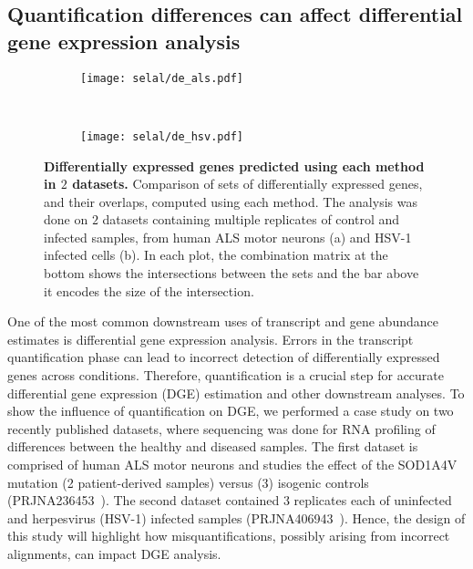 \subsection{Quantification differences can affect differential gene expression analysis}
\label{sec:DE}
\begin{figure}[ht!]
    \centering
    \begin{subfigure}[t]{0.49\textwidth}
        \centering
  	  	\texttt{[image: selal/de\_als.pdf]}
		\caption{}
    \end{subfigure}
    ~ 
    \begin{subfigure}[t]{0.49\textwidth}
        \centering
  	  	\texttt{[image: selal/de\_hsv.pdf]}
		\caption{}
    \end{subfigure}
    \caption{\textbf{Differentially expressed genes predicted using each method in $2$ datasets.} 
    Comparison of sets of differentially expressed genes, and their overlaps, computed using each method.
    The analysis was done on $2$ datasets containing multiple replicates of control and infected samples, from human ALS
    motor neurons (a) and HSV-1 infected cells (b). In each plot, the combination matrix at the bottom shows the intersections between the sets and the bar above
      it encodes the size of the intersection. }
    \label{fig:dge}
\end{figure}

One of the most common downstream uses of transcript and gene abundance estimates is
differential gene expression analysis. Errors in the
transcript quantification phase can lead to incorrect detection of
differentially expressed genes across conditions. Therefore, quantification
is a crucial step for accurate differential gene expression (DGE) estimation and
other downstream analyses. To show the influence of quantification on DGE, we
performed a case study on two recently published datasets, where sequencing was
done for RNA profiling of differences between the healthy and diseased samples. 
The first dataset is comprised of human ALS motor neurons and studies the effect 
of the SOD1A4V mutation (2 patient-derived samples) versus (3) isogenic controls (PRJNA236453~\citep{kiskinis2014pathways}). The
second dataset contained $3$ replicates each of uninfected and herpesvirus (HSV-1) infected 
samples (PRJNA406943~\citep{shi2018deep}). Hence, the design of this study will highlight how
misquantifications, possibly arising from incorrect alignments, can impact DGE analysis.


